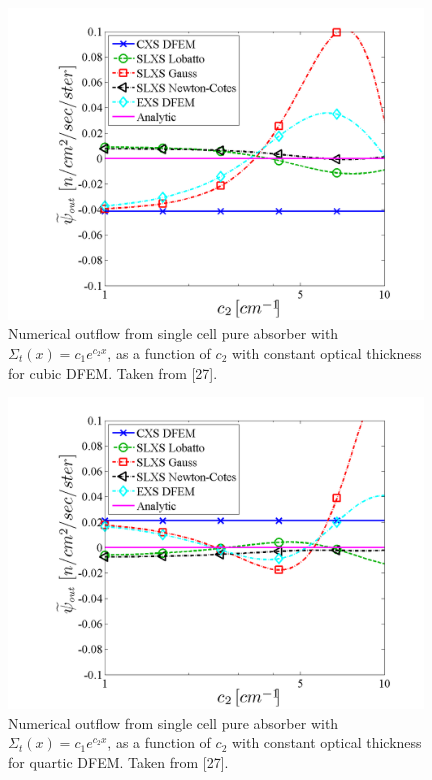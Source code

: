 \begin{figure}[!htp]
\centering
\includegraphics[width=11cm]{chapter3_variable_xs/Exp_outflow_p3.png}
\caption{Numerical outflow from single cell pure absorber with $\Sigma_t(x) = c_1e^{c_2 x}$, as a function of $c_2$ with constant optical thickness for cubic DFEM.  Taken from [27].}
\label{fig:exp_outflow_p3}
\end{figure}
%
%
\begin{figure}[!hbp]
\centering
\includegraphics[width=11cm]{chapter3_variable_xs/Exp_outflow_p4.png}
\caption{Numerical outflow from single cell pure absorber with $\Sigma_t(x) = c_1e^{c_2 x}$, as a function of $c_2$ with constant optical thickness for quartic DFEM.  Taken from [27].}
\label{fig:exp_outflow_p4}
\end{figure}

